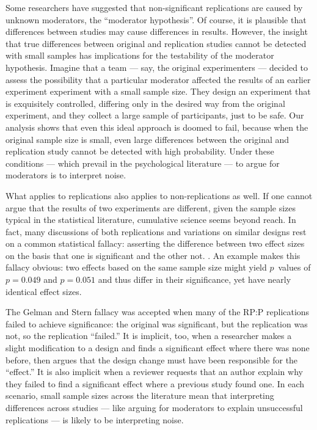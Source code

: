 \documentclass[doc,a4paper,floatsintext,draftfirst]{apa6}
\begin{document}
Some researchers have suggested that non-significant replications are caused by unknown moderators, the ``moderator hypothesis''. Of course, it is plausible that differences between studies may cause differences in results. However, the insight that true differences between original and replication studies cannot be detected with small samples has implications for the testability of the moderator hypothesis. Imagine that a team --- say, the original experimenters --- decided to assess the possibility that a particular moderator affected the results of an earlier experiment experiment with a small sample size. They design an experiment that is exquisitely controlled, differing only in the desired way from the original experiment, and they collect a large sample of participants, just to be safe. Our analysis shows that even this ideal approach is doomed to fail, because when the original sample size is small, even large differences between the original and replication study cannot be detected with high probability. Under these conditions --- which prevail in the psychological literature --- to argue for moderators is to interpret noise. 

What applies to replications also applies to non-replications as well. If one cannot argue that the results of two experiments are different, given the sample sizes typical in the statistical literature, cumulative science seems beyond reach. In fact, many discussions of both replications and variations on similar designs rest on a common statistical fallacy: asserting the difference between two effect sizes on the basis that one is significant and the other not. \citep{Gelman:Stern:2006}. An example makes this fallacy obvious: two effects based on the same sample size might yield $p$~values of $p=0.049$ and $p=0.051$ and thus differ in their significance, yet have nearly identical effect sizes. 

The Gelman and Stern fallacy was accepted when many of the RP:P replications failed to achieve significance: the original was significant, but the replication was not, so the replication ``failed.'' It is implicit, too, when a researcher makes a slight modification to a design and finds a significant effect where there was none before, then argues that the design change must have been responsible for the ``effect.'' It is also implicit when a reviewer requests that an author explain why they failed to find a significant effect where a previous study found one. In each scenario, small sample sizes across the literature mean that interpreting differences across studies --- like arguing for moderators to explain unsuccessful replications --- is likely to be interpreting noise.
\end{document}
